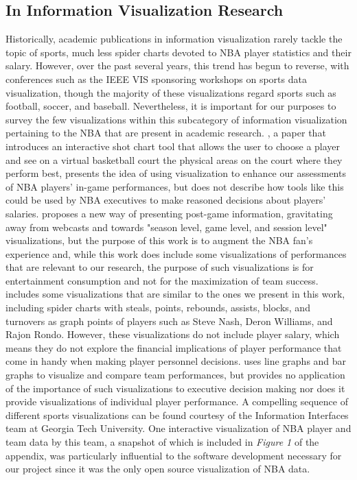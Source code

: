 \documentclass[journal]{vgtc}                %
\begin{document}
\subsection{In Information Visualization Research}
Historically, academic publications in information visualization rarely tackle the topic of sports, much less spider charts devoted to NBA player statistics and their salary. However, over the past several years, this trend has begun to reverse, with conferences such as the IEEE VIS sponsoring workshops on sports data visualization, though the majority of these visualizations regard sports such as football, soccer, and baseball. Nevertheless, it is important for our purposes to survey the few visualizations within this subcategory of information visualization pertaining to the NBA that are present in academic research. \cite{chu}, a paper that introduces an interactive shot chart tool that allows the user to choose a player and see on a virtual basketball court the physical areas on the court where they perform best, presents the idea of using visualization to enhance our assessments of NBA players' in-game performances, but does not describe how tools like this could be used by NBA executives to make reasoned decisions about players' salaries. \cite{chen} proposes a new way of presenting post-game information, gravitating away from webcasts and towards "season level, game level, and session level" visualizations, but the purpose of this work is to augment the NBA fan's experience and, while this work does include some visualizations of performances that are relevant to our research, the purpose of such visualizations is for entertainment consumption and not for the maximization of team success. \cite{pagno} includes some visualizations that are similar to the ones we present in this work, including spider charts with steals, points, rebounds, assists, blocks, and turnovers as graph points of players such as Steve Nash, Deron Williams, and Rajon Rondo. However, these visualizations do not include player salary, which means they do not explore the financial implications of player performance that come in handy when making player personnel decisions. \cite{reyna} uses line graphs and bar graphs to visualize and compare team performances, but provides no application of the importance of such visualizations to executive decision making nor does it provide visualizations of individual player performance. A compelling sequence of different sports visualizations can be found courtesy of the Information Interfaces team at Georgia Tech University. One interactive visualization of NBA player and team data by this team, a snapshot of which is included in \emph{Figure 1} of the appendix, was particularly influential to the software development necessary for our project since it was the only open source visualization of NBA data.
\end{document}
